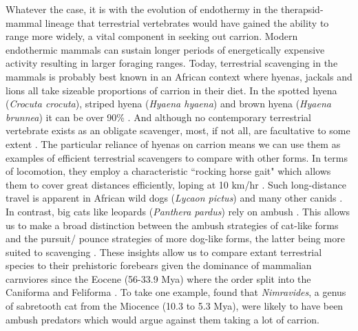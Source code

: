 \documentclass[a4paper,12pt]{article}
\begin{document}
Whatever the case, it is with the evolution of endothermy in the therapsid-mammal lineage \citep{clarke2010temperature} that terrestrial vertebrates would have gained the ability to range more widely, a vital component in seeking out carrion.
Modern endothermic mammals can sustain longer periods of energetically expensive activity \citep{bennett1979endothermy} resulting in larger foraging ranges. 
Today, terrestrial scavenging in the mammals is probably best known in an African context where hyenas, jackals and lions all take sizeable proportions of carrion in their diet.
In the spotted hyena (\textit{Crocuta crocuta}), striped hyena (\textit{Hyaena hyaena}) and brown hyena (\textit{Hyaena brunnea}) it can be over 90\% \citep{jones2015african}.
And although no contemporary terrestrial vertebrate exists as an obligate scavenger, most, if not all, are facultative to some extent \citep{beasley2015vertebrates}.
The particular reliance of hyenas on carrion means we can use them as examples of efficient terrestrial scavengers to compare with other forms. 
In terms of locomotion, they employ a characteristic ``rocking horse gait"  which allows them to cover great distances efficiently, loping at 10 km/hr \citep{mills1989comparative,jones2015african}. 
Such long-distance travel is apparent in African wild dogs (\textit{Lycaon pictus}) and many other canids \citep{pennycuick1995radius,janis2014forelimb}. 
In contrast, big cats like leopards (\textit{Panthera pardus}) rely on ambush \citep{pennycuick1995radius}. 
This allows us to make a broad distinction between the ambush strategies of cat-like forms and the pursuit/ pounce strategies of more dog-like forms, the latter being more suited to scavenging \citep{janis2014forelimb}. 
These insights allow us to compare extant terrestrial species to their prehistoric forebears given the dominance of mammalian carnviores since the Eocene (56-33.9 Mya) where the order split into the Caniforma and Feliforma \citep{van1987skeletal}.
To take one example, \cite{anyonge1996locomotor} found that \textit{Nimravides}, a genus of sabretooth cat from the Miocence (10.3 to 5.3 Mya), were likely to have been ambush predators which would argue against them taking a lot of carrion. 
\end{document}
